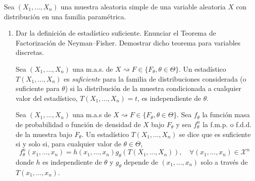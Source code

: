 \documentclass[12pt]{article}
\newcommand{\X}{\mathcal{X}}
\begin{document}
    \begin{ejercicio}[2,25 puntos]
        Sea $(X_1,\ldots,X_n)$ una muestra aleatoria simple de una variable aleatoria $X$ con
        distribución en una familia paramétrica.

        \begin{enumerate}
            \item[a)] Dar la definición de estadístico suficiente. Enunciar el Teorema de
            Factorización de Neyman--Fisher. Demostrar dicho teorema para variables discretas. \\

            \begin{definicion}\label{definicion:d1}
                Sea $(X_1, \ldots, X_n)$ una m.a.s. de $X \rightsquigarrow F \in \{F_\theta, \theta \in \Theta\}$. Un estadístico
                $T(X_1, \ldots, X_n)$ es \textit{suficiente} para la familia de distribuciones considerada (o suficiente para $\theta$)
                si la distribución de la muestra condicionada a cualquier valor del estadístico, $T(X_1, \ldots, X_n) = t$, es independiente de $\theta$.
            \end{definicion}

            \begin{teo}\label{teo:t1}
                Sea $(X_1, \ldots, X_n)$ una m.a.s de $X \rightsquigarrow F \in \{F_\theta, \theta \in \Theta\}$. Sea $f_\theta$ la función 
                masa de probabilidad o función de densidad de $X$ bajo $F_\theta$ y sea $f_\theta^n$ la f.m.p. o f.d.d. de la muestra bajo $F_\theta$.
                Un estadístico $T(X_1, \ldots, X_n)$ se dice que es suficiente si y solo si, para cualquier valor de $\theta \in \Theta$,
                $$f_\theta^n(x_1, \ldots, x_n) = h(x_1, \ldots, x_n)g_\theta(T(X_1, \ldots, X_n)), \quad \forall (x_1, \ldots, x_n) \in \X^n$$
                donde $h$ es independiente de $\theta$ y $g_\theta$ depende de $(x_1, \ldots, x_n)$ solo a través de $T(x_1, \ldots, x_n)$.
            \end{teo}


\end{enumerate}
\end{ejercicio}
\end{document}
